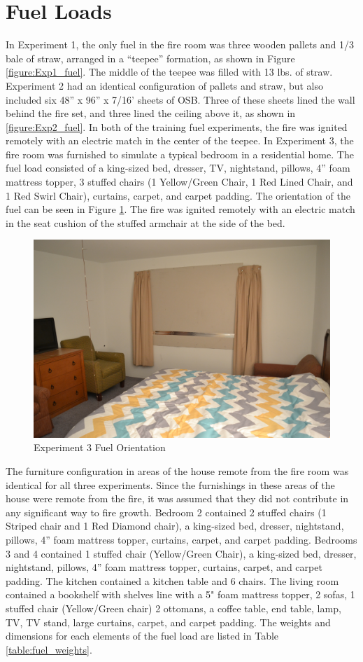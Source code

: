 \documentclass[12pt,oneside]{book}
\begin{document}
\section{Fuel Loads}
 In Experiment 1, the only fuel in the fire room was three wooden pallets and 1/3 bale of straw,  arranged in a ``teepee'' formation, as shown in Figure \ref{figure:Exp1_fuel}. The middle of the teepee was filled with 13 lbs. of straw.  Experiment 2 had an identical configuration of pallets and straw, but also included six  48'' x 96'' x 7/16'  sheets of OSB. Three of these sheets lined the wall behind the fire set, and three lined the ceiling above it, as shown in \ref{figure:Exp2_fuel}. In both of the training fuel experiments, the fire was ignited remotely with an electric match in the center of the teepee. In Experiment 3, the fire room was furnished to simulate a typical bedroom in a residential home. The fuel load consisted of a king-sized bed, dresser, TV, nightstand, pillows, 4'' foam mattress topper, 3 stuffed chairs (1 Yellow/Green Chair, 1 Red Lined Chair, and 1 Red Swirl Chair), curtains, carpet, and carpet padding.  The orientation of the fuel can be seen in Figure \ref{figure:Exp3_fuel}. The fire was ignited remotely  with an electric match in the seat cushion of the stuffed armchair at the side of the bed.

\begin{figure}[H]
\centering
\includegraphics[width=.75\textwidth]{0_Images/Ranch_Pictures/Exp_3_Fuel.jpg}
\caption{Experiment 3 Fuel Orientation}
\label{figure:Exp3_fuel}
\end{figure}

The furniture configuration in areas of the house remote from the fire room was identical for all three experiments. Since the furnishings in these areas of the house were remote from the fire, it was assumed that they did not contribute in any significant way to fire growth.  Bedroom 2 contained 2 stuffed chairs (1 Striped chair and 1 Red Diamond chair), a king-sized bed, dresser, nightstand, pillows, 4'' foam mattress topper, curtains, carpet, and carpet padding. Bedrooms 3 and 4 contained 1 stuffed chair (Yellow/Green Chair), a king-sized bed, dresser, nightstand, pillows, 4'' foam mattress topper, curtains, carpet, and carpet padding. The kitchen contained a kitchen table and 6 chairs. The living room contained a bookshelf with shelves line with a 5" foam mattress topper, 2 sofas, 1 stuffed chair (Yellow/Green chair) 2 ottomans, a coffee table, end table, lamp, TV, TV stand, large curtains, carpet, and carpet padding. The weights and dimensions for each elements of the fuel load are listed in Table \ref{table:fuel_weights}.
\end{document}
